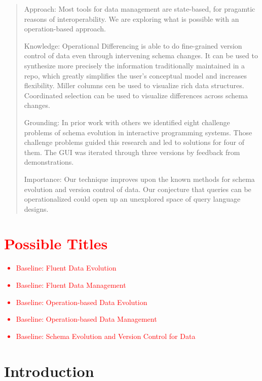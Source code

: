 \documentclass[english,submission]{programming}
\theoremstyle{definition}
\begin{document}
\begin{abstract}
Approach: Most tools for data management are state-based, for pragamtic reasons of interoperability. We are exploring what is possible with an operation-based approach.

Knowledge: Operational Differencing is able to do fine-grained version control of data even through intervening schema changes. It can be used to synthesize more precisely the information traditionally maintained in a repo, which greatly simplifies the user's conceptual model and increases flexibility. Miller columns cen be used to visualize rich data structures. Coordinated selection can be used to visualize differences across schema changes.

Grounding: In prior work with others we identified eight challenge problems of schema evolution in interactive programming systems. Those challenge problems guided this research and led to solutions for four of them.
The GUI was iterated through three versions by feedback from demonstrations.

Importance: Our technique improves upon the known methods for schema evolution and version control of data. Our conjecture that queries can be operationalized could open up an unexplored space of query language designs.

\end{abstract}


\section{\textcolor{red}{Possible Titles}}
\textcolor{red}{
  \begin{itemize}
  \item Baseline: Fluent Data Evolution
  \item Baseline: Fluent Data Management
  \item Baseline: Operation-based Data Evolution
  \item Baseline: Operation-based Data Management
  \item Baseline: Schema Evolution and Version Control for Data
  \end{itemize}
  }


\section{Introduction}
\end{document}
